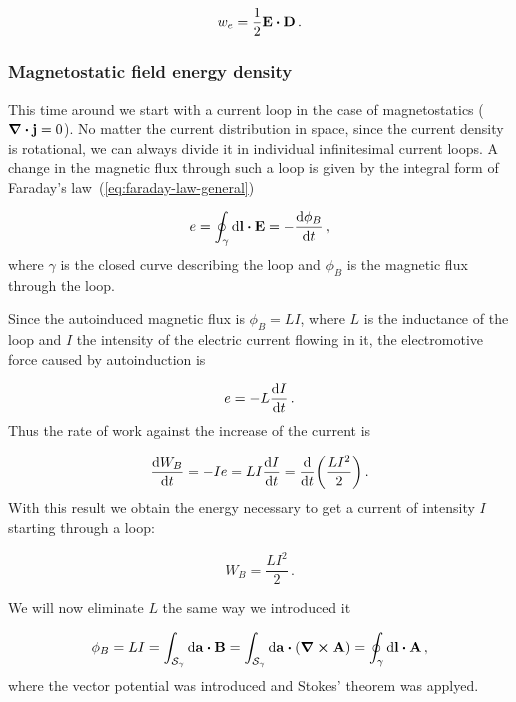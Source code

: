 \documentclass[12pt, class=report, crop=false]{standalone}
\begin{document}
\begin{equation}
  \label{def:electrostatic-en-density}
  w_{e} = \frac{1}{2} \vb{E} \vdot \vb{D} \,.
\end{equation}

\subsubsection{Magnetostatic field energy density}

This time around we start with a current loop in the case of magnetostatics (\(\div{\vb{j}}=0\)). No matter the current distribution in space, since the current density is rotational, we can always divide it in individual infinitesimal current loops. A change in the magnetic flux through such a loop is given by the integral form of Faraday's law~(\ref{eq:faraday-law-general})

\begin{equation}
  e = \oint_{\gamma} \dd{\vb{l}}\vdot\vb{E} = - \dv{\phi_{B}}{t} \,,
\end{equation}
where \(\gamma\) is the closed curve describing the loop and \(\phi_{B}\) is the magnetic flux through the loop.

\par
Since the autoinduced magnetic flux is \(\phi_{B}=LI\), where \(L\) is the inductance of the loop and \(I\) the intensity of the electric current flowing in it, the electromotive force caused by autoinduction is

\begin{equation*}
  e = -L \dv{I}{t} \,.
\end{equation*}
Thus the rate of work against the increase of the current is

\begin{equation*}
  \dv{W_{B}}{t} = - I e = LI \dv{I}{t} = \dv{t} (\frac{LI^{2}}{2})\,.
\end{equation*}
With this result we obtain the energy necessary to get a current of intensity \(I\) starting through a loop:

\begin{equation*}
  W_{B} = \frac{LI^2}{2} \,.
\end{equation*}

\par
We will now eliminate \(L\) the same way we introduced it

\begin{equation*}
  \phi_{B} = LI = \int_{\mathcal{S}_\mathcal{\gamma}} \dd{\vb{a}} \vdot \vb{B} =  \int_{\mathcal{S}_\mathcal{\gamma}} \dd{\vb{a}} \vdot (\curl{\vb{A}}) = \oint_{\gamma} \dd{\vb{l}}\vdot \vb{A} \,,
\end{equation*}
where the vector potential was introduced and Stokes' theorem  was applyed.
\end{document}
